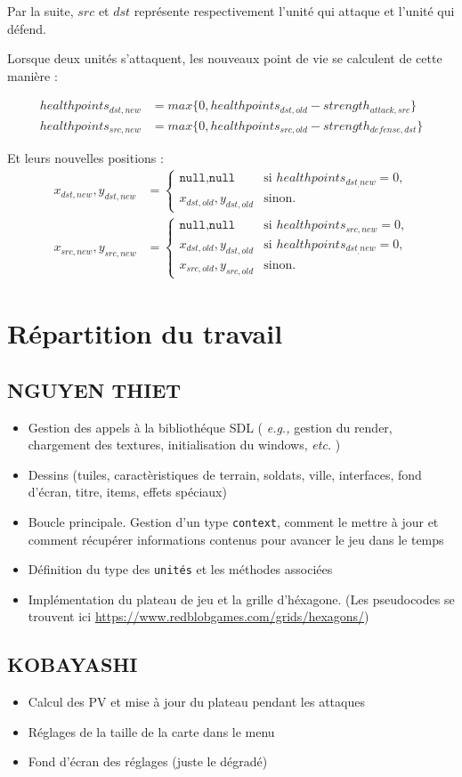 \documentclass{article}
\begin{document}
Par la suite, $src$ et $dst$ représente respectivement l'unité qui attaque et l'unité
qui défend.

Lorsque deux unités s'attaquent, les nouveaux point de vie se calculent de cette manière : 

\begin{align}
    healthpoints_{dst,new} &= max \{0,healthpoints_{dst,old} - strength_{attack,src}\} \\
    healthpoints_{src,new} &= max \{0,healthpoints_{src,old} - strength_{defense,dst}\}
\end{align}

Et leurs nouvelles positions : 
\begin{align}
     x_{dst,new},y_{dst,new} &=
     \begin{cases}
        \texttt{null},\texttt{null} & \text{si } healthpoints_{dst_,new} = 0 \text{,}\\
        x_{dst,old},y_{dst,old} & \text{sinon.} 
     \end{cases} \\
     x_{src,new},y_{src,new} &=
     \begin{cases}
        \texttt{null},\texttt{null} & \text{si } healthpoints_{src,new} = 0 \text{,}\\
        x_{dst,old},y_{dst,old} & \text{si } healthpoints_{dst_,new} = 0 \text{,}\\
        x_{src,old},y_{src,old} & \text{sinon.} 
     \end{cases}
\end{align}

\section{Répartition du travail}
\subsection{NGUYEN THIET}
\begin{itemize}
    \item Gestion des appels à la bibliothéque SDL ( \textit{e.g.,} gestion du render, chargement des textures, initialisation
    du windows, \textit{etc.} )
    \item Dessins (tuiles, caractèristiques de terrain, soldats, ville, interfaces, fond d'écran, titre, items, effets spéciaux)
    \item Boucle principale. Gestion d'un type \texttt{context}, comment le mettre à jour et comment récupérer informations contenus pour avancer le jeu dans le temps
    \item Définition du type des \texttt{unités} et les méthodes associées
    \item Implémentation du plateau de jeu et la grille d'héxagone. (Les pseudocodes se trouvent ici \url{https://www.redblobgames.com/grids/hexagons/})
\end{itemize}

\subsection{KOBAYASHI}
\begin{itemize}
    \item Calcul des PV et mise à jour du plateau pendant les attaques 
    \item Réglages de la taille de la carte dans le menu
    \item Fond d'écran des réglages (juste le dégradé)
\end{itemize}
\end{document}

